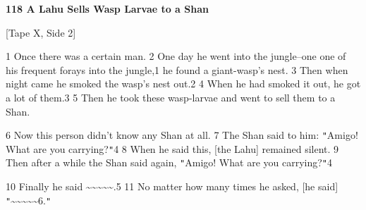 
\textbf{118 A Lahu Sells Wasp Larvae to a Shan }

[Tape X, Side 2]

1 Once there was a certain man. 2 One day he went into the jungle--one one of his
frequent forays into the jungle,1 he found a giant-wasp's nest. 3 Then when night
came he smoked the wasp's nest out.2 4 When he had smoked it out, he got a lot
of them.3 5 Then he took these wasp-larvae and went to sell them to a Shan.

6 Now this person didn't know any Shan at all. 7 The Shan said to him: \texttt{"}Amigo!
What are you carrying?\texttt{"}4 8 When he said this, [the Lahu] remained silent.
9 Then after a while the Shan said again, \texttt{"}Amigo! What are you carrying?\texttt{"}4

10 Finally he said \textasciitilde{}\textasciitilde{}\textasciitilde{}\textasciitilde{}\textasciitilde{}.5
11 No matter how many times he asked, [he said] \texttt{"}\textasciitilde{}\textasciitilde{}\textasciitilde{}\textasciitilde{}\textasciitilde{}6.\texttt{"}

